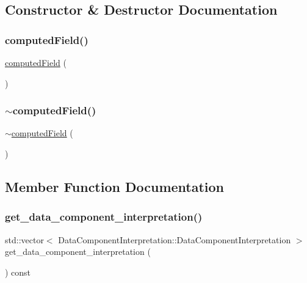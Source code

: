 \subsection{Constructor \& Destructor Documentation}
\mbox{\label{classcomputed_field_ab4f4245d1d8abf1daeedbf2784d6c42a}} 
\subsubsection{\texorpdfstring{computedField()}{computedField()}}
{\footnotesize\ttfamily \mbox{\hyperlink{classcomputed_field}{computed\+Field}} (\begin{DoxyParamCaption}{ }\end{DoxyParamCaption})}

\mbox{\label{classcomputed_field_a23cfaecc3df333ef21739f65a72c81ff}} 
\subsubsection{\texorpdfstring{$\sim$computedField()}{~computedField()}}
{\footnotesize\ttfamily $\sim$\mbox{\hyperlink{classcomputed_field}{computed\+Field}} (\begin{DoxyParamCaption}{ }\end{DoxyParamCaption})}



\subsection{Member Function Documentation}
\mbox{\label{classcomputed_field_a3a7ceb57bada784f078912268a0774a7}} 
\subsubsection{\texorpdfstring{get\_data\_component\_interpretation()}{get\_data\_component\_interpretation()}}
{\footnotesize\ttfamily std\+::vector$<$ Data\+Component\+Interpretation\+::\+Data\+Component\+Interpretation $>$ get\+\_\+data\+\_\+component\+\_\+interpretation (\begin{DoxyParamCaption}{ }\end{DoxyParamCaption}) const}

